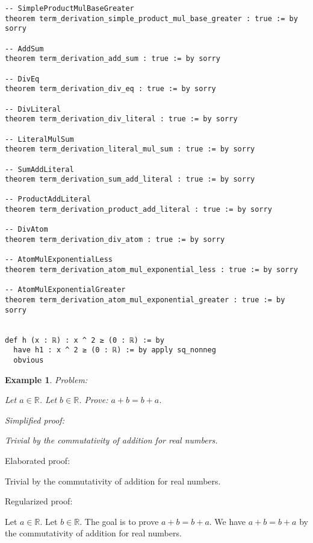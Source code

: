 \documentclass{article}
\newtheorem{example}{Example}
\begin{document}
\begin{tcolorbox}[colback=white!10, width=\linewidth]
\begin{lstlisting}[language=Lean4]
-- SimpleProductMulBaseGreater
theorem term_derivation_simple_product_mul_base_greater : true := by sorry

-- AddSum
theorem term_derivation_add_sum : true := by sorry

-- DivEq
theorem term_derivation_div_eq : true := by sorry

-- DivLiteral
theorem term_derivation_div_literal : true := by sorry

-- LiteralMulSum
theorem term_derivation_literal_mul_sum : true := by sorry

-- SumAddLiteral
theorem term_derivation_sum_add_literal : true := by sorry

-- ProductAddLiteral
theorem term_derivation_product_add_literal : true := by sorry

-- DivAtom
theorem term_derivation_div_atom : true := by sorry

-- AtomMulExponentialLess
theorem term_derivation_atom_mul_exponential_less : true := by sorry

-- AtomMulExponentialGreater
theorem term_derivation_atom_mul_exponential_greater : true := by sorry


def h (x : ℝ) : x ^ 2 ≥ (0 : ℝ) := by
  have h1 : x ^ 2 ≥ (0 : ℝ) := by apply sq_nonneg
  obvious

\end{lstlisting}
\end{tcolorbox}


\begin{example}
Problem:
\begin{tcolorbox}[colback=yellow!10, width=\linewidth]
Let $a\in\mathbb{R}$. Let $b\in\mathbb{R}$. Prove: $a+b=b+a$.
\end{tcolorbox}

Simplified proof:
\begin{tcolorbox}[colback=blue!10, width=\linewidth]
Trivial by the commutativity of addition for real numbers.
\end{tcolorbox}
\end{example}

Elaborated proof:
\begin{tcolorbox}[colback=green!10, width=\linewidth]
Trivial by the commutativity of addition for real numbers.
\end{tcolorbox}

Regularized proof:
\begin{tcolorbox}[colback=red!10, width=\linewidth]
Let $a\in\mathbb{R}$.
Let $b\in\mathbb{R}$.
The goal is to prove $a+b=b+a$.
We have $a+b=b+a$ by the commutativity of addition for real numbers.
\end{tcolorbox}
\end{document}
